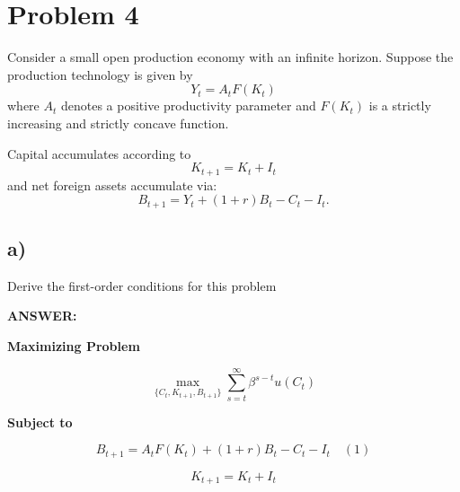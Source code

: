 \documentclass[12pt]{article}
\begin{document}
\section*{\noindent\textbf{Problem 4}}

Consider a small open production economy with an infinite horizon. Suppose the production 
technology is given by 
\[
Y_t = A_t F(K_t)
\]
where \( A_t \) denotes a positive productivity parameter and \( F(K_t) \) is a strictly increasing and strictly concave function.  

Capital accumulates according to 
\[
K_{t+1} = K_t + I_t
\]
and net foreign assets accumulate via:
\[
B_{t+1} = Y_t + (1+r)B_t - C_t - I_t.
\]


\subsection*{\noindent\textbf{a)}}

Derive the first-order conditions for this problem

\vspace{0.5em}
\noindent\textcolor{formalred}{\textbf{ANSWER:}}

\textbf{Maximizing Problem}  

\[
\max_{\{C_t, K_{t+1}, B_{t+1}\}} \sum_{s=t}^{\infty} \beta^{s-t} u(C_t)
\]

\textbf{Subject to}  

\[
B_{t+1} = A_t F(K_t) + (1+r)B_t - C_t - I_t \quad (1)
\]

\[
K_{t+1} = K_t + I_t
\]
\end{document}

